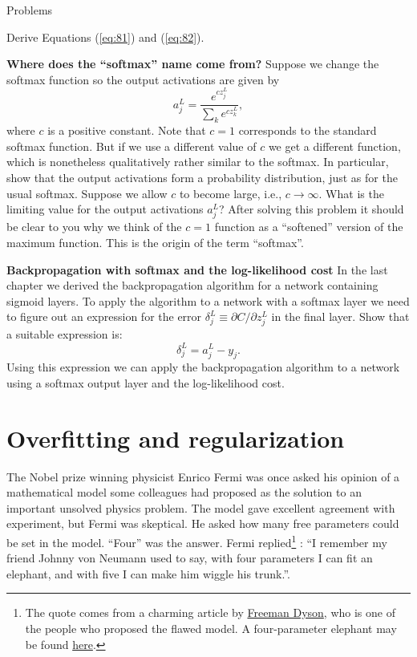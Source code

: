 \documentclass[a4paper,twoside,10pt]{book}
\begin{document}
\begin{exercize}{Problems}
\item Derive Equations (\ref{eq:81}) and (\ref{eq:82}).
\item \textbf{Where does the ``softmax'' name come from?} Suppose we change the softmax function so the output activations are given by
\begin{equation}
	a^L_j = \frac{e^{c z^L_j}}{\sum_k e^{c z^L_k}},\label{eq:83}
\end{equation}
where $c$ is a positive constant. Note that $c=1$ corresponds to the standard softmax function. But if we use a different value of $c$ we get a different function, which is nonetheless qualitatively rather similar to the softmax. In particular, show that the output activations form a probability distribution, just as for the usual softmax. Suppose we allow $c$ to become large, i.e., $c\to \infty$. What is the limiting value for the output activations $a^L_j$? After solving this problem it should be clear to you why we think of the $c=1$ function as a ``softened'' version of the maximum function. This is the origin of the term ``softmax''.
\item \textbf{Backpropagation with softmax and the log-likelihood cost} In the last chapter we derived the backpropagation algorithm for a network containing sigmoid layers. To apply the algorithm to a network with a softmax layer we need to figure out an expression for the error $\delta^L_j \equiv \partial C / \partial z^L_j$ in the final layer. Show that a suitable expression is:
\begin{equation}
\delta^L_j = a^L_j -y_j. \label{eq:84}
\end{equation}
Using this expression we can apply the backpropagation algorithm to a network using a softmax output layer and the log-likelihood cost.
\end{exercize}

\section{Overfitting and regularization}
\label{sec:3.2}
The Nobel prize winning physicist Enrico Fermi was once asked his opinion of a mathematical model some colleagues had proposed as the solution to an important unsolved physics problem. The model gave excellent agreement with experiment, but Fermi was skeptical. He asked how many free parameters could be set in the model. ``Four'' was the answer. Fermi replied\footnote{The quote comes from a charming article by \href{http://www.nature.com/nature/journal/v427/n6972/full/427297a.html}{Freeman Dyson}, who is one of the people who proposed the flawed model. A four-parameter elephant may be found \href{http://www.johndcook.com/blog/2011/06/21/how-to-fit-an-elephant/}{here}.} : ``I remember my friend Johnny von Neumann used to say, with four parameters I can fit an elephant, and with five I can make him wiggle his trunk.''.
\end{document}
